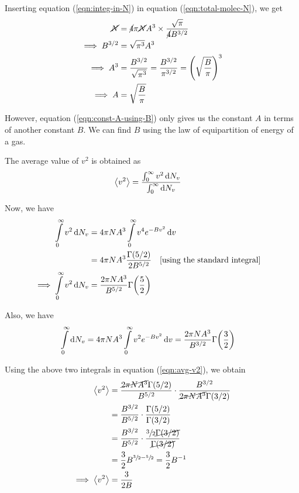 			Inserting equation (\ref{eqn:integ-in-N}) in equation (\ref{eqn:total-molec-N}), we get
			\begin{align}
				\cancel{N}&=\cancel{4}\pi \cancel{N}A^3\times\dfrac{\sqrt{\pi}}{\cancel{4}B^{3/2}} \nonumber\\
				\implies B^{3/2}&=\sqrt{\pi^3}A^3 \nonumber\\
				\implies A^3&=\dfrac{B^{3/2}}{\sqrt{\pi^3}}=\dfrac{B^{3/2}}{\pi^{3/2}}=\qty(\sqrt{\dfrac{B}{\pi}})^3 \nonumber\\
				\implies A&=\sqrt{\dfrac{B}{\pi}} \label{eqn:const-A-using-B}
			\end{align}
			
			However, equation (\ref{eqn:const-A-using-B}) only gives us the constant $A$ in terms of another constant $B$. We can find $B$ using the law of equipartition of energy of a gas.
			
			The average value of $v^2$ is obtained as
			\begin{align}
				\expval{v^2}&=\dfrac{\int_{0}^{\infty}{v^2\dd{N_v}}}{\int_{0}^{\infty}{\dd{N_v}}} \label{eqn:avg-v2}
			\end{align}
			
			Now, we have
			\begin{align*}
				\int\limits_{0}^{\infty}{v^2\dd{N_v}}&=4\pi NA^3\int\limits_{0}^{\infty}{v^4e^{-Bv^2}\dd{v}} \\
					&=4\pi NA^3\dfrac{\Gamma(5/2)}{2B^{5/2}}\qq{[using the standard integral]} \\
				\implies\int\limits_{0}^{\infty}{v^2\dd{N_v}}&=\dfrac{2\pi NA^3}{B^{5/2}}\Gamma\qty(\dfrac{5}{2})
			\end{align*}
			
			Also, we have
			\begin{align*}
				\int\limits_{0}^{\infty}{\dd{N_v}}&=4\pi NA^3\int\limits_{0}^{\infty}{v^2e^{-Bv^2}\dd{v}}=\dfrac{2\pi NA^3}{B^{3/2}}\Gamma\qty(\dfrac{3}{2})
			\end{align*}
			
			Using the above two integrals in equation (\ref{eqn:avg-v2}), we obtain
			\begin{align}
				\expval{v^2}&=\dfrac{\cancel{2\pi NA^3}\Gamma(5/2)}{B^{5/2}}\cdot\dfrac{B^{3/2}}{\cancel{2\pi NA^3}\Gamma(3/2)} \nonumber\\
					&=\dfrac{B^{3/2}}{B^{5/2}}\cdot\dfrac{\Gamma(5/2)}{\Gamma(3/2)} \nonumber\\
					&=\dfrac{B^{3/2}}{B^{5/2}}\cdot\dfrac{\sfrac{3}{2}\cancel{\Gamma(3/2)}}{\cancel{\Gamma(3/2)}} \nonumber\\
					&=\dfrac{3}{2}B^{\sfrac{3}{2}-\sfrac{5}{2}}=\dfrac{3}{2}B^{-1} \nonumber\\
				\implies\expval{v^2}&=\dfrac{3}{2B} \label{eqn:avg-v2-using-B}
			\end{align}
			
